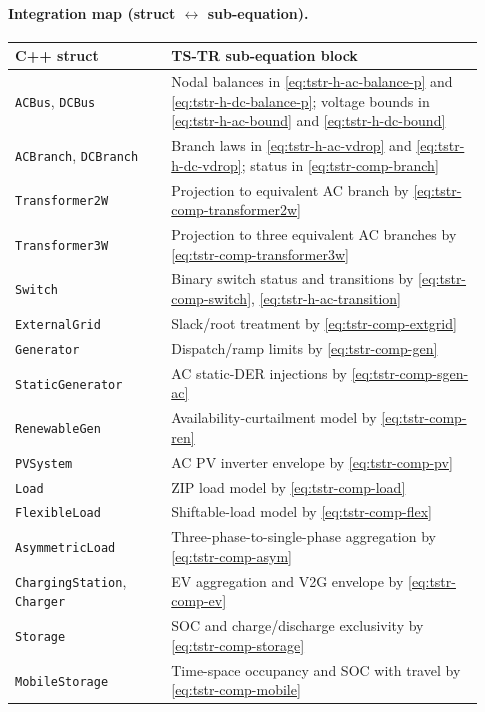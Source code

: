 \paragraph{Integration map (struct \(\leftrightarrow\) sub-equation).}
{\small
\begin{longtable}{L{0.31\linewidth}L{0.62\linewidth}}
\toprule
C++ struct & TS-TR sub-equation block \\
\midrule
\endhead
\texttt{ACBus}, \texttt{DCBus} & Nodal balances in \eqref{eq:tstr-h-ac-balance-p} and \eqref{eq:tstr-h-dc-balance-p}; voltage bounds in \eqref{eq:tstr-h-ac-bound} and \eqref{eq:tstr-h-dc-bound} \\
\texttt{ACBranch}, \texttt{DCBranch} & Branch laws in \eqref{eq:tstr-h-ac-vdrop} and \eqref{eq:tstr-h-dc-vdrop}; status in \eqref{eq:tstr-comp-branch} \\
\texttt{Transformer2W} & Projection to equivalent AC branch by \eqref{eq:tstr-comp-transformer2w} \\
\texttt{Transformer3W} & Projection to three equivalent AC branches by \eqref{eq:tstr-comp-transformer3w} \\
\texttt{Switch} & Binary switch status and transitions by \eqref{eq:tstr-comp-switch}, \eqref{eq:tstr-h-ac-transition} \\
\texttt{ExternalGrid} & Slack/root treatment by \eqref{eq:tstr-comp-extgrid} \\
\texttt{Generator} & Dispatch/ramp limits by \eqref{eq:tstr-comp-gen} \\
\texttt{StaticGenerator} & AC static-DER injections by \eqref{eq:tstr-comp-sgen-ac} \\
\texttt{RenewableGen} & Availability-curtailment model by \eqref{eq:tstr-comp-ren} \\
\texttt{PVSystem} & AC PV inverter envelope by \eqref{eq:tstr-comp-pv} \\
\texttt{Load} & ZIP load model by \eqref{eq:tstr-comp-load} \\
\texttt{FlexibleLoad} & Shiftable-load model by \eqref{eq:tstr-comp-flex} \\
\texttt{AsymmetricLoad} & Three-phase-to-single-phase aggregation by \eqref{eq:tstr-comp-asym} \\
\texttt{ChargingStation}, \texttt{Charger} & EV aggregation and V2G envelope by \eqref{eq:tstr-comp-ev} \\
\texttt{Storage} & SOC and charge/discharge exclusivity by \eqref{eq:tstr-comp-storage} \\
\texttt{MobileStorage} & Time-space occupancy and SOC with travel by \eqref{eq:tstr-comp-mobile} \\

\end{longtable}}
